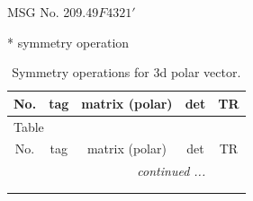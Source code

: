 \documentclass[fleqn,8pt]{jsarticle}
\begin{document}
\setcounter{MaxMatrixCols}{32}

\renewcommand{\tablename}{Table~}
\renewcommand{\figurename}{Figure~}
\begin{center}
\LARGE
MSG No. 209.49\quad$F4321'$
\end{center}
* symmetry operation
\renewcommand{\arraystretch}{1.3}
\begin{longtable}{ccccc}
\caption{Symmetry operations for 3d polar vector.}
 \\
 \hline \hline
No. & tag & matrix (polar) & det & TR \\ \hline \endfirsthead

\multicolumn{4}{l}{\tablename\ \thetable{}} \\
 \hline \hline
No. & tag & matrix (polar) & det & TR \\ \hline \endhead

 \hline \hline
\multicolumn{4}{r}{\footnotesize\it continued ...} \\ \endfoot

 \hline \hline
\multicolumn{4}{r}{} \\ \endlastfoot


\end{longtable}
\end{document}
